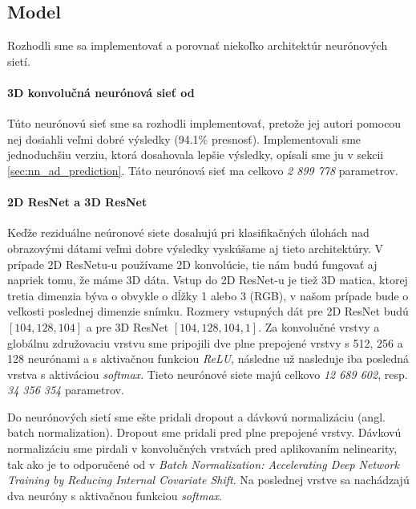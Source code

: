 \subsection{Model}

Rozhodli sme sa implementovať a porovnať niekoľko architektúr neurónových sietí.

\paragraph{3D konvolučná neurónová sieť od \citeauthor*{esmaeilzadeh2018end}} Túto neurónovú sieť sme sa rozhodli implementovať, pretože jej autori pomocou nej dosiahli veľmi dobré výsledky (94.1\% presnosť). Implementovali sme jednoduchšiu verziu, ktorá dosahovala lepšie výsledky, opísali sme ju v sekcii \ref{sec:nn_ad_prediction}. Táto neurónová sieť ma celkovo \textit{2 899 778} parametrov.

\paragraph{2D ResNet a 3D ResNet} Keďže reziduálne neúronové siete dosahujú pri klasifikačných úlohách nad obrazovými dátami veľmi dobre výsledky vyskúšame aj tieto architektúry. V prípade 2D ResNetu-u používame 2D konvolúcie, tie nám budú fungovať aj napriek tomu, že máme 3D dáta. Vstup do 2D ResNet-u je tiež 3D matica, ktorej tretia dimenzia býva o obvykle o dĺžky 1 alebo 3 (RGB), v našom prípade bude o veľkosti poslednej dimenzie snímku. Rozmery vstupných dát pre 2D ResNet budú $[104, 128, 104]$ a pre 3D ResNet $[104, 128, 104, 1]$. Za konvolučné vrstvy a globálnu združovaciu vrstvu sme pripojili dve plne prepojené vrstvy s 512, 256 a 128 neurónami a s aktivačnou funkciou \textit{ReLU}, následne už nasleduje iba posledná vrstva s aktiváciou \textit{softmax}. Tieto neurónové siete majú celkovo \textit{12 689 602}, resp. \textit{34 356 354} parametrov.


Do neurónových sietí sme ešte pridali dropout a dávkovú normalizáciu (angl. batch normalization). Dropout sme pridali pred plne prepojené vrstvy. Dávkovú normalizáciu sme pirdali v konvolučných vrstvách pred aplikovaním nelinearity, tak ako je to odporučené od \citeauthor*{ioffe2015batch} v \textit{Batch Normalization: Accelerating Deep Network Training by Reducing Internal Covariate Shift}. Na poslednej vrstve sa nachádzajú dva neuróny s aktivačnou funkciou \textit{softmax}.

